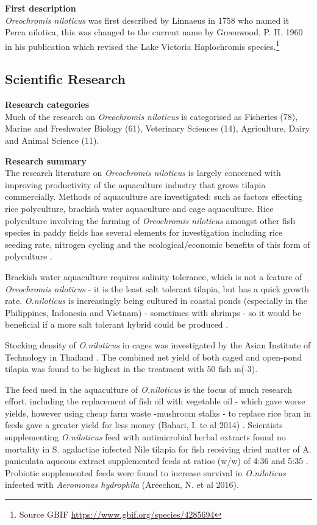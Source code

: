 \documentclass[]{book}
\theoremstyle{definition}
\theoremstyle{definition}
\theoremstyle{definition}
\theoremstyle{remark}
\begin{document}
\textbf{First description}\\
\emph{Oreochromis niloticus} was first described by Linnaeus in 1758 who
named it Perca nilotica, this was changed to the current name by
Greenwood, P. H. 1960 in his publication which revised the Lake Victoria
Haplochromis species.\footnote{Source GBIF
  \url{https://www.gbif.org/species/4285694}}

\hypertarget{scientific-research-5}{%
\subsection{Scientific Research}\label{scientific-research-5}}

\textbf{Research categories}\\
Much of the research on \emph{Oreochromis niloticus} is categorised as
Fisheries (78), Marine and Freshwater Biology (61), Veterinary Sciences
(14), Agriculture, Dairy and Animal Science (11).

\textbf{Research summary}\\
The research literature on \emph{Oreochromis niloticus} is largely
concerned with improving productivity of the aquaculture industry that
grows tilapia commercially. Methods of aquaculture are investigated:
such as factors effecting rice polyculture, brackish water aquaculture
and cage aquaculture. Rice polyculture involving the farming of
\emph{Oreochromis niloticus} amongst other fish species in paddy fields
has several elements for investigation including rice seeding rate,
nitrogen cycling and the ecological/economic benefits of this form of
polyculture \citep{Vromant_2002, Rothuis_1999, Oehme_2007}.

Brackish water aquaculture requires salinity tolerance, which is not a
feature of \emph{Oreochromis niloticus} - it is the least salt tolerant
tilapia, but has a quick growth rate. \emph{O.niloticus} is increasingly
being cultured in coastal ponds (especially in the Philippines,
Indonesia and Vietnam) - sometimes with shrimps - so it would be
beneficial if a more salt tolerant hybrid could be produced
\citep{Kamal_2005}.

Stocking density of \emph{O.niloticus} in cages was investigated by the
Asian Institute of Technology in Thailand \citep{Yi_1996}. The combined
net yield of both caged and open-pond tilapia was found to be highest in
the treatment with 50 fish m(-3).

The feed used in the aquaculture of \emph{O.niloticus} is the focus of
much research effort, including the replacement of fish oil with
vegetable oil - which gave worse yields, however using cheap farm waste
-mushroom stalks - to replace rice bran in feeds gave a greater yield
for less money (Bahari, I. te al 2014) \citep{Karapanagiotidis_2007}.
Scientists supplementing \emph{O.niloticus} feed with antimicrobial
herbal extracts found no mortality in S. agalactiae infected Nile
tilapia for fish receiving dried matter of A. paniculata aqueous extract
supplemented feeds at ratios (w/w) of 4:36 and 5:35
\citep{Rattanachaikunsopon_2009}. Probiotic supplemented feeds were
found to increase survival in \emph{O.niloticus} infected with
\emph{Aeromonas hydrophila} (Areechon, N. et al 2016).
\end{document}
